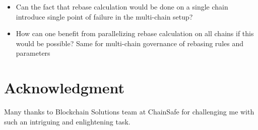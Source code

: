 \documentclass{article}
\begin{document}
\begin{itemize}
	\item Can the fact that rebase calculation would be done on a single chain introduce single point of failure in the multi-chain setup?
	\item How can one benefit from parallelizing rebase calculation on all chains if this would be possible? Same for multi-chain governance of rebasing rules and parameters
\end{itemize}

\section{Acknowledgment}

Many thanks to Blockchain Solutions team at ChainSafe for challenging me with such an intriguing and enlightening task.



\end{document}
